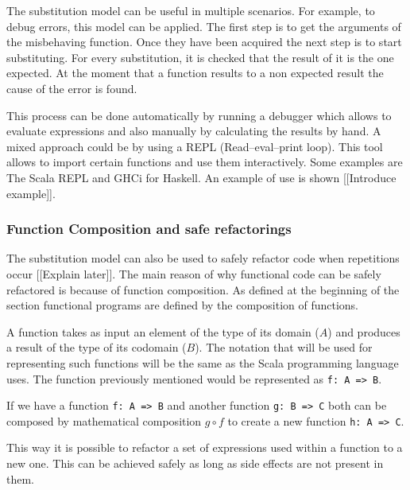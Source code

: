 \documentclass[../main.tex]{subfiles}
\begin{document}
The substitution model can be useful in multiple scenarios. For example, to debug errors, this model can be applied. The first step is to get the arguments of the misbehaving function. Once they have been acquired the next step is to start substituting. For every substitution, it is checked that the result of it is the one expected. At the moment that a function results to a non expected result the cause of the error is found.

This process can be done automatically by running a debugger which allows to evaluate expressions and also manually by calculating the results by hand. A mixed approach could be by using a REPL (Read–eval–print loop). This tool allows to import certain functions and use them interactively. Some examples are The Scala REPL and GHCi for Haskell. An example of use is shown [[Introduce example]].

\subsubsection{Function Composition and safe refactorings}
The substitution model can also be used to safely refactor code when repetitions occur [[Explain later]].  
The main reason of why functional code can be safely refactored is because of function composition. As defined at the beginning of the section functional programs are defined by the composition of functions.

A function takes as input an element of the type of its domain ($A$) and produces a result of the type of its codomain ($B$). The notation that will be used for representing such functions will be the same as the Scala programming language uses. The function previously mentioned would be represented as \texttt{f: A => B}.

If we have a function \texttt{f: A => B} and another function \texttt{g: B => C} both can be composed by mathematical composition $g \circ f$ to create a new function \texttt{h: A => C}.

This way it is possible to refactor a set of expressions used within a function to a new one. This can be achieved safely as long as side effects are not present in them.
\end{document}
